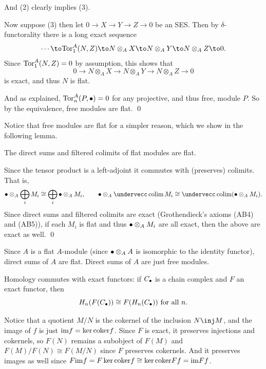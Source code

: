     And (2) clearly implies (3).

    Now suppose (3) then let $0\to X\to Y\to Z\to0$ be an SES.
    Then by $\delta$-functorality there is a long exact sequence
    $$ \cdots \to \tor^A_1(N,Z) \to N\otimes_AX \to N\otimes_AY \to N\otimes_AZ \to 0 . $$
    Since ${\rm Tor}^A_1(N,Z)=0$ by assumption, this shows that
    $$ 0 \to N\otimes_AX \to N\otimes_AY \to N\otimes_AZ \to 0 $$
    is exact, and thus $N$ is flat.

    And as explained, ${\rm Tor}^A_n(P,\bullet)=0$ for any projective, and thus free, module $P$.
    So by the equivalence, free modules are flat.
    \qed

\eproof

Notice that free modules are flat for a simpler reason, which we show in the following lemma.

\blemm

    The direct sums and filtered colimits of flat modules are flat.

\elemm

\bproof

    Since the tensor product is a left-adjoint it commutes with (preserves) colimits.
    That is,
    $$ \bul\otimes_A\bigoplus_iM_i \cong \bigoplus_i\bul\otimes_AM_i,\qquad \bul\otimes_A\coflim M_i \cong \coflim(\bul\otimes_AM_i) . $$
    Since direct sums and filtered colimits are exact (Grothendieck's axioms (AB4) and (AB5)), if each $M_i$ is flat and thus $\bullet\otimes_AM_i$ are all exact,
    then the above are exact as well.
    \qed

\eproof

Since $A$ is a flat $A$-module (since $\bullet\otimes_AA$ is isomorphic to the identity functor), direct sums of $A$ are flat.
Direct sums of $A$ are just free modules.

\blemm

    Homology commutes with exact functors: if $C_\bullet$ is a chain complex and $F$ an exact functor, then
    $$ H_n(F(C_\bullet)) \cong F(H_n(C_\bullet)) \hbox{ for all $n$} . $$

\elemm

\bproof

    Notice that a quotient $M/N$ is the cokernel of the inclusion $N\inj M$, and the image of $f$ is just ${\rm im} f=\mathop{\rm ker}{\rm coker} f$.
    Since $F$ is exact, it preserves injections and cokernels, so $F(N)$ remains a subobject of $F(M)$ and $F(M)/F(N)\cong F(M/N)$ since $F$ preserves cokernels.
    And it preserves images as well since $F{\rm im} f=F\mathop{\rm ker}{\rm coker} f\cong\mathop{\rm ker}{\rm coker} Ff={\rm im} Ff$.

